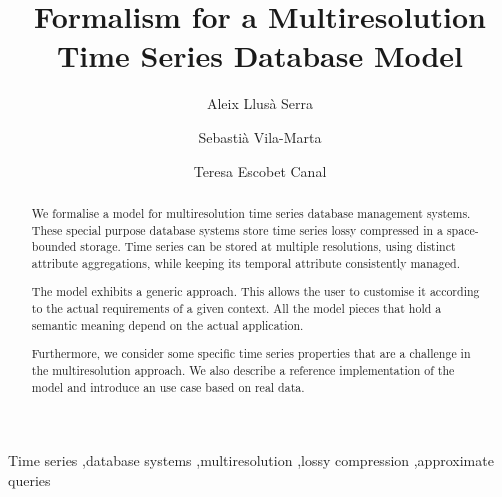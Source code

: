 \documentclass[
  preprint,
  review,
  twocolumn,
  5p,
  sort&compress,
]{elsarticle}
\begin{document}


\begin{frontmatter}

  \title{Formalism for a Multiresolution Time Series Database Model}


  \author
  [dipse]
  {Aleix Llus\`{a} Serra}

  \author
  [dipse]
  {Sebasti\`{a} Vila-Marta
  }

  \author
  [dipse]
  {Teresa Escobet Canal
  }



  \address
  [dipse]
  {Department of Electronic System Design and Programming\\ Universitat Polit\`{e}cnica de Catalunya\\ Av.~Bases de Manresa 61--73, 08242 Manresa, ES-CT}



  \begin{abstract}
    We formalise a model for multiresolution time series
    database management systems.
    These special purpose database systems store time series lossy
    compressed in a space-bounded storage.
    Time series can be stored at multiple resolutions, using
    distinct attribute aggregations, while keeping its temporal
    attribute consistently managed.
   
    The model exhibits a generic approach. This allows the user to
    customise it according to the actual requirements of a given
    context.
    All the model pieces that hold a semantic meaning depend on
    the actual application.

    Furthermore, we consider some specific time series properties that
    are a challenge in the multiresolution approach.
    We also describe a reference implementation of the model
    and introduce an use case based on real data.
  \end{abstract}


  \begin{keyword}
    Time series \sep database systems \sep multiresolution \sep lossy
    compression \sep approximate queries
  \end{keyword}

\end{frontmatter}
\end{document}
